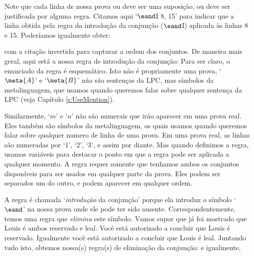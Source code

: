  Note que cada linha de nossa prova  ou deve ser uma suposição, ou deve ser justificada por alguma regra.    Citamos  aqui   `$\eand$I 8, 15' para indicar que a linha obtida pela regra da introdução  da conjunção  ($\eand$I) aplicada às linhas 8 e 15.  Poderíamos igualmente obter:
\begin{fitchproof}
	 
\end{fitchproof}
 
 com a citação invertida para capturar a ordem  dos  conjuntos. 
De maneira mais geral, aqui está  a nossa regra de introdução da  conjunção:
Para ser claro, o enunciado da regra é esquemático.  Isto não é propriamente uma prova,      `$\meta{A}$'  e `$\meta{B}$'  não são sentenças da LPC, mas símbolos da metalinguagem, que usamos quando queremos falar sobre qualquer sentença da LPC (veja Capítulo \ref{s:UseMention}).

Similarmente,  `$m$' e `$n$' não são numerais  que irão aparecer em uma prova real. Eles também são símbolos da metalinguagem, os quais usamos quando queremos falar sobre qualquer numero de linha  de uma prova. Em uma  prova real, as linhas  são numeradas por `$1$', `$2$', `$3$', e assim por diante.  Mas quando definimos a regra, usamos variáveis   para destacar o ponto em que a regra pode ser aplicada a qualquer momento.  A regra requer somente que tenhamos ambos os conjuntos disponíveis para ser usados em qualquer parte da prova. Eles podem ser separados um do outro, e podem aparecer em qualquer ordem.

A regra é chamada `\emph{introdução} da conjunção'  porque  ela introduz  o símbolo `$\eand$' na nossa  prova onde ele pode ter sido ausente.  Correspondentemente,  temos uma regra que \emph{elimina}  este  símbolo.  Vamos supor que já foi mostrado que Louis é ambos  reservado e  leal.  Você   está autorizado a concluir que Louis   é reservado. Igualmente você   está autorizado a concluir que Louis   é leal.  Juntando tudo isto, obtemos nossa(s) regra(s) de eliminação da conjunção:
e igualmente, 

 
